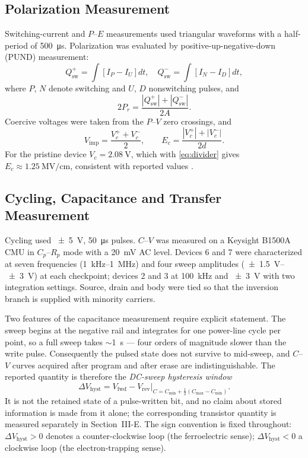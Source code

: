 \documentclass[journal]{IEEEtran}
\newcommand{\rev}[1]{{\color{blue}#1}}      %
\newcommand{\Prem}{P_r}
\newcommand{\Ec}{E_c}
\newcommand{\Vc}{V_c}
\newcommand{\Vimp}{V_{\mathrm{imp}}}
\newcommand{\dVh}{\Delta V_{\mathrm{hyst}}}
\newcommand{\MVcm}{\mega\volt\per\centi\meter}
\begin{document}
\subsection{Polarization Measurement}
Switching-current and $P$--$E$ measurements used triangular waveforms
with a half-period of \SI{500}{\micro\second}. Polarization was
evaluated by positive-up-negative-down (PUND) measurement:
\begin{equation}
Q_{\mathrm{sw}}^{+}=\int\!\left[I_P-I_U\right]dt,\quad
Q_{\mathrm{sw}}^{-}=\int\!\left[I_N-I_D\right]dt,
\label{eq:pund}
\end{equation}
where $P$, $N$ denote switching and $U$, $D$ nonswitching pulses, and
\begin{equation}
2\Prem=\frac{|Q_{\mathrm{sw}}^{+}|+|Q_{\mathrm{sw}}^{-}|}{2A}.
\label{eq:2pr}
\end{equation}
Coercive voltages were taken from the $P$--$V$ zero crossings, and
\begin{equation}
\Vimp=\frac{\Vc^{+}+\Vc^{-}}{2},\qquad
\Ec=\frac{|\Vc^{+}|+|\Vc^{-}|}{2d}.
\label{eq:imprint}
\end{equation}
For the pristine device $\Vc=\SI{2.08}{\volt}$, which with
\eqref{eq:divider} gives $\Ec\approx\SI{1.25}{\MVcm}$, consistent with
reported values \cite{Ferro_switching,imprint3}.

\subsection{Cycling, Capacitance and Transfer Measurement}
Cycling used \SI{\pm5}{\volt}, \SI{50}{\micro\second} pulses. $C$--$V$
was measured on a Keysight B1500A CMU in $C_p$--$R_p$ mode with a
\SI{20}{\milli\volt} AC level. \rev{Devices 6 and 7 were characterized at
seven frequencies (\SI{1}{\kilo\hertz}--\SI{1}{\mega\hertz}) and four
sweep amplitudes (\SI{\pm1.5}{\volt}--\SI{\pm3}{\volt}) at each
checkpoint; devices 2 and 3 at \SI{100}{\kilo\hertz} and
\SI{\pm3}{\volt} with two integration settings.} Source, drain and body
were tied so that the inversion branch is supplied with minority
carriers.

Two features of the capacitance measurement require explicit statement.
The sweep begins at the negative rail and integrates for one power-line
cycle per point, so a full sweep takes $\sim$\SI{1}{\second} --- four
orders of magnitude slower than the write pulse. Consequently the pulsed
state does not survive to mid-sweep, and $C$--$V$ curves acquired after
program and after erase are indistinguishable. The reported quantity is
therefore the \emph{DC-sweep hysteresis window}
\begin{equation}
\dVh = V_{\mathrm{fwd}} - V_{\mathrm{rev}}
       \Big|_{C=C_{\min}+\frac{1}{2}(C_{\max}-C_{\min})}.
\label{eq:window}
\end{equation}
\rev{It is not the retained state of a pulse-written bit, and no claim
about stored information is made from it alone; the corresponding
transistor quantity is measured separately in Section~III-E.} The sign
convention is fixed throughout: $\dVh>0$ denotes a counter-clockwise
loop (the ferroelectric sense); $\dVh<0$ a clockwise loop (the
electron-trapping sense).
\end{document}
